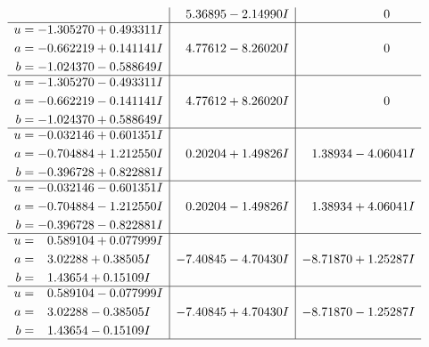 \documentclass[1p]{elsarticle_modified}
\theoremstyle{definition}
\begin{document}
$$\begin{array}{c|c|c}
 & \phantom{-}5.36895 - 2.14990 I & \phantom{-0.000000 } 0 \\ \hline\begin{aligned}
u &= -1.305270 + 0.493311 I \\
a &= -0.662219 + 0.141141 I \\
b &= -1.024370 - 0.588649 I\end{aligned}
 & \phantom{-}4.77612 - 8.26020 I & \phantom{-0.000000 } 0 \\ \hline\begin{aligned}
u &= -1.305270 - 0.493311 I \\
a &= -0.662219 - 0.141141 I \\
b &= -1.024370 + 0.588649 I\end{aligned}
 & \phantom{-}4.77612 + 8.26020 I & \phantom{-0.000000 } 0 \\ \hline\begin{aligned}
u &= -0.032146 + 0.601351 I \\
a &= -0.704884 + 1.212550 I \\
b &= -0.396728 + 0.822881 I\end{aligned}
 & \phantom{-}0.20204 + 1.49826 I & \phantom{-}1.38934 - 4.06041 I \\ \hline\begin{aligned}
u &= -0.032146 - 0.601351 I \\
a &= -0.704884 - 1.212550 I \\
b &= -0.396728 - 0.822881 I\end{aligned}
 & \phantom{-}0.20204 - 1.49826 I & \phantom{-}1.38934 + 4.06041 I \\ \hline\begin{aligned}
u &= \phantom{-}0.589104 + 0.077999 I \\
a &= \phantom{-}3.02288 + 0.38505 I \\
b &= \phantom{-}1.43654 + 0.15109 I\end{aligned}
 & -7.40845 - 4.70430 I & -8.71870 + 1.25287 I \\ \hline\begin{aligned}
u &= \phantom{-}0.589104 - 0.077999 I \\
a &= \phantom{-}3.02288 - 0.38505 I \\
b &= \phantom{-}1.43654 - 0.15109 I\end{aligned}
 & -7.40845 + 4.70430 I & -8.71870 - 1.25287 I\\
 \hline 
 \end{array}$$\newpage$$\begin{array}{c|c|c}  

\end{array}$$
\end{document}
